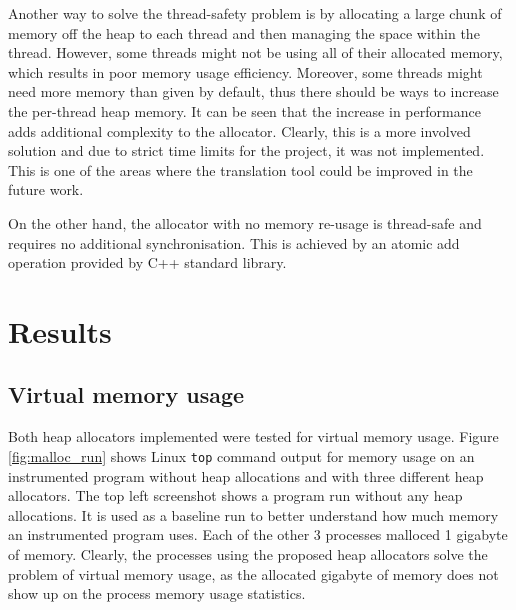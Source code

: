 \documentclass[bsc,frontabs,twoside,singlespacing,parskip,deptreport]{infthesis}     %
\begin{document}
Another way to solve the thread-safety problem is by allocating a large chunk of memory off the heap to each thread and then managing the space within the thread. However, some threads might not be using all of their allocated memory, which results in poor memory usage efficiency. Moreover, some threads might need more memory than given by default, thus there should be ways to increase the per-thread heap memory. It can be seen that the increase in performance adds additional complexity to the allocator. Clearly, this is a more involved solution and due to strict time limits for the project, it was not implemented. This is one of the areas where the translation tool could be improved in the future work.

On the other hand, the allocator with no memory re-usage is thread-safe and requires no additional synchronisation. This is achieved by an atomic add operation provided by C++ standard library.

\section{Results}

\subsection{Virtual memory usage}

Both heap allocators implemented were tested for virtual memory usage. Figure \ref{fig:malloc_run} shows Linux \texttt{top} command output for memory usage on an instrumented program without heap allocations and with three different heap allocators. The top left screenshot shows a program run without any heap allocations. It is used as a baseline run to better understand how much memory an instrumented program uses. Each of the other 3 processes malloced 1 gigabyte of memory. Clearly, the processes using the proposed heap allocators solve the problem of virtual memory usage, as the allocated gigabyte of memory does not show up on the process memory usage statistics.
\end{document}
